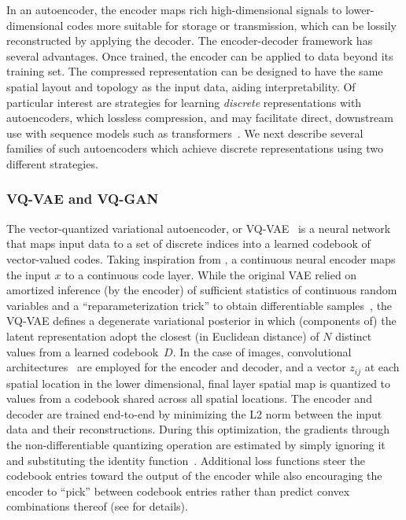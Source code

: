 \documentclass[11pt, a4paper, logo, copyright, numbering]{googledeepmind}
\begin{document}
In an autoencoder, the encoder maps rich high-dimensional signals to lower-dimensional codes more suitable for storage or transmission, which can be lossily reconstructed by applying the decoder.
The encoder-decoder framework has several advantages. Once trained, the encoder can be applied to data beyond its training set. The compressed representation can be designed to have the same spatial layout and topology as the input data, aiding interpretability. Of particular interest are strategies for learning \emph{discrete} representations with autoencoders, which lossless compression, and may facilitate direct, downstream use with sequence models such as transformers~\citep{vaswani2017transformer, nguyen2023climax}.
We next describe several families of such autoencoders which achieve discrete representations using two different strategies.



















 
\subsubsection{VQ-VAE and VQ-GAN}

The vector-quantized variational autoencoder, or VQ-VAE~\citep{oord2017vqvae} is a neural network that maps input data to a set of discrete indices into a learned codebook of vector-valued codes.
Taking inspiration from \cite{kingma2014vae}, a continuous neural encoder maps the input $x$ to a continuous code layer. While the original VAE relied on amortized inference (by the encoder) of sufficient statistics of continuous random variables and a ``reparameterization trick'' to obtain differentiable samples~\citep{williams1992simple,rezende2014reparameterizationtrick}, the VQ-VAE defines a degenerate variational posterior in which (components of) the latent representation adopt the closest (in Euclidean distance) of $N$ distinct values from a learned codebook~$D$.
In the case of images, convolutional architectures~\citep{lecun1989generalization} are employed for the encoder and decoder, and a vector $z_{ij}$ at each spatial location in the lower dimensional, final layer spatial map is quantized to values from a codebook shared across all spatial locations. The encoder and decoder are trained end-to-end by minimizing the L2 norm between the input data and their reconstructions. During this optimization, the gradients through the non-differentiable quantizing operation are estimated by simply ignoring it and substituting the identity function~\citep{hinton2012coursera,bengio2013estimating,theis2017lossy}.
Additional loss functions steer the codebook entries toward the output of the encoder while also encouraging the encoder to ``pick'' between codebook entries rather than predict convex combinations thereof (see \citet{oord2017vqvae} for details).
\end{document}
